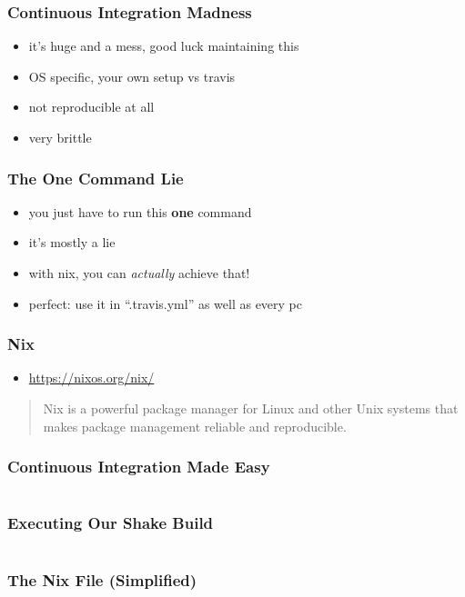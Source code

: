 \documentclass{beamer}
\begin{document}
\begin{frame}
  \frametitle{Continuous Integration Madness}
  \begin{itemize}
  \item it's huge and a mess, good luck maintaining this
  \item OS specific, your own setup vs travis
  \item not reproducible at all
  \item very brittle
  \end{itemize}
\end{frame}

\begin{frame}
  \frametitle{The One Command Lie}
  \begin{itemize}
  \item you just have to run this \textbf{one} command
  \item it's mostly a lie
  \item with nix, you can \textit{actually} achieve that!
  \item perfect: use it in ``.travis.yml'' as well as every pc
  \end{itemize}
\end{frame}

\begin{frame}
  \frametitle{Nix}
  \begin{itemize}
  \item \url{https://nixos.org/nix/}
  \end{itemize}
  \begin{quote}
    Nix is a powerful package manager for Linux and other Unix systems that makes package management reliable and reproducible.
  \end{quote}
\end{frame}

\begin{frame}
  \frametitle{Continuous Integration Made Easy}
  \inputminted{yaml}{snippets/travis.yml}
\end{frame}

\begin{frame}
  \frametitle{Executing Our Shake Build}
  \inputminted[breaklines]{yaml}{snippets/build-shebang.hs}
\end{frame}

\begin{frame}
  \frametitle{The Nix File (Simplified)}
  \inputminted{nix}{static-source/simple-shell.nix}
\end{frame}
\end{document}
